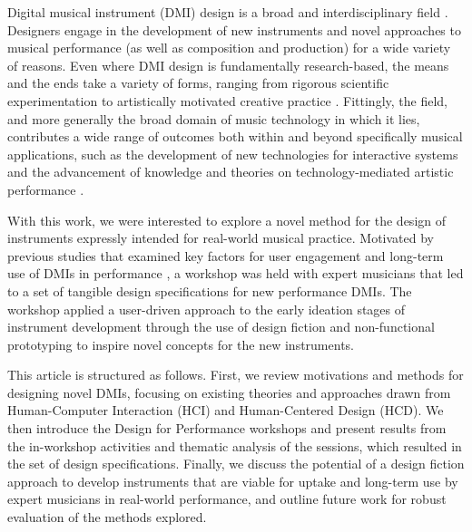 \documentclass[letterpaper, 12pt]{article}
\begin{document}


Digital musical instrument (DMI) design is a broad and interdisciplinary field \citep{Miranda2006a}. Designers engage in the development of new instruments and novel approaches to musical performance (as well as composition and production) for a wide variety of reasons. Even where DMI design is fundamentally research-based, the means and the ends take a variety of forms, ranging from rigorous scientific experimentation to artistically motivated creative practice \citep{Gurevich2016}. Fittingly, the field, and more generally the broad domain of music technology in which it lies, contributes a wide range of outcomes both within and beyond specifically musical applications, such as the development of new technologies for interactive systems \citep{malloch2018generalized} and the advancement of knowledge and theories on technology-mediated artistic performance \citep{Tahlroglu2020}. 

With this work, we were interested to explore a novel method for the design of instruments expressly intended for real-world musical practice. Motivated by previous studies that examined key factors for user engagement \citep{OBrien2008} and long-term use of DMIs in performance \citep{Sullivan2021jnmr, Wallis2013}, a workshop was held with expert musicians that led to a set of tangible design specifications for new performance DMIs. The workshop applied a user-driven approach to the early ideation stages of instrument development through the use of design fiction \citep{Blythe2014} and non-functional prototyping \citep{Pigrem2018} to inspire novel concepts for the new instruments. 

This article is structured as follows. First, we review motivations and methods for designing novel DMIs, focusing on existing theories and approaches drawn from Human-Computer Interaction (HCI) and Human-Centered Design (HCD). We then introduce the Design for Performance workshops and present results from the in-workshop activities and thematic analysis of the sessions, which resulted in the set of design specifications. Finally, we discuss the potential of a design fiction approach to develop instruments that are viable for uptake and long-term use by expert musicians in real-world performance, and outline future work for robust evaluation of the methods explored.
\end{document}
